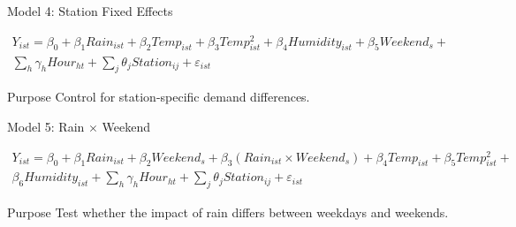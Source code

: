 \documentclass[aspectratio=169]{beamer}
\begin{document}
%
\begin{frame}{Model 4: Station Fixed Effects}

\[
\begin{aligned}
Y_{ist}
=
\beta_0
+
\beta_1 Rain_{ist}
+
\beta_2 Temp_{ist}
+
\beta_3 Temp_{ist}^{2}
+
\beta_4 Humidity_{ist}
+
\beta_5 Weekend_s
+ \\
\sum_h \gamma_h Hour_{ht}
+
\sum_j \theta_j Station_{ij}
+
\varepsilon_{ist}
\end{aligned}
\]

\begin{block}{Purpose}
Control for station-specific demand differences.
\end{block}

\end{frame}
%
\begin{frame}{Model 5: Rain $\times$ Weekend}

\[
\begin{aligned}
Y_{ist}
=
\beta_0
+
\beta_1 Rain_{ist}
+
\beta_2 Weekend_s
+
\beta_3
(Rain_{ist}\times Weekend_s)
+
\beta_4 Temp_{ist}
+ 
\beta_5 Temp_{ist}^{2}
+ \\
\beta_6 Humidity_{ist}
+
\sum_h \gamma_h Hour_{ht}
+
\sum_j \theta_j Station_{ij}
+
\varepsilon_{ist}
\end{aligned}
\]

\begin{block}{Purpose}
Test whether the impact of rain differs between weekdays and weekends.
\end{block}

\end{frame}
%

%
\end{document}

